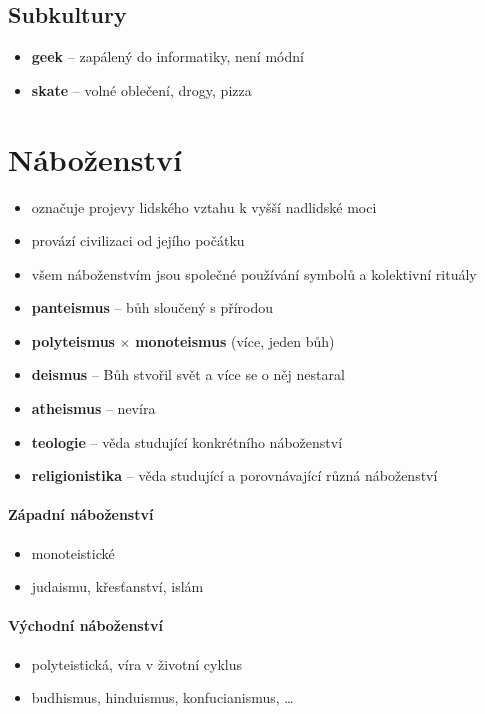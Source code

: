 \subsection{Subkultury}
\begin{itemize}
\item \textbf{geek} -- zapálený do informatiky, není módní
\item \textbf{skate} -- volné oblečení, drogy, pizza
\end{itemize}

\newpage
\section{Náboženství}
\begin{itemize}
\item označuje projevy lidského vztahu k vyšší nadlidské moci
\item provází civilizaci od jejího počátku
\item všem náboženstvím jsou společné používání symbolů a kolektivní rituály
\item \textbf{panteismus} -- bůh sloučený s přírodou
\item \textbf{polyteismus} $\times$ \textbf{monoteismus} (více, jeden bůh)
\item \textbf{deismus} -- Bůh stvořil svět a více se o něj nestaral
\item \textbf{atheismus} -- nevíra
\item \textbf{teologie} -- věda studující konkrétního  náboženství
\item \textbf{religionistika} -- věda studující a porovnávající různá náboženství
\end{itemize}

\paragraph{Západní náboženství}
\begin{itemize}
\item monoteistické	
\item judaismu, křesťanství, islám
\end{itemize}

\paragraph{Východní náboženství}
\begin{itemize}
\item polyteistická, víra v životní cyklus
\item budhismus, hinduismus, konfucianismus, \ldots
\end{itemize}

